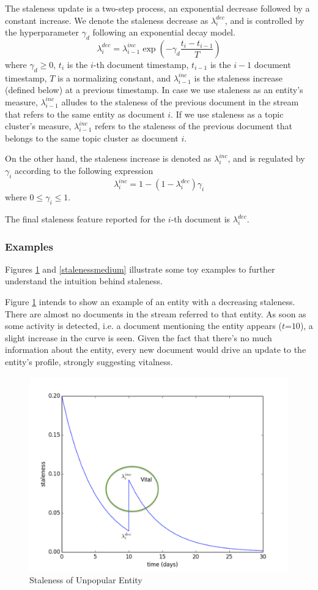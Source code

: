 \documentclass{article}
\begin{document}
The staleness update is a two-step process, an exponential decrease followed by a constant increase.
We denote the staleness decrease as $\lambda^{dec}_i$, and is controlled by the hyperparameter $\gamma_d$ following an exponential decay model.
\begin{equation}
\label{decrease}
\lambda^{dec}_i = \lambda^{inc}_{{i-1}} \exp{(-\gamma_d \frac{t_i-t_{i-1}}{T})}
\end{equation}
where $\gamma_d \geq 0$, $t_i$ is the $i$-th document timestamp, $t_{i-1}$ is the $i-1$ document timestamp, $T$ is a normalizing constant, and $\lambda^{inc}_{i-1}$ is the staleness increase (defined below) at a previous timestamp.
In case we use staleness as an entity's measure, $\lambda^{inc}_{i-1}$ alludes to the staleness of the previous document in the stream that refers to the same entity as document $i$.
If we use staleness as a topic cluster's measure, $\lambda^{inc}_{i-1}$ refers to the staleness of the previous document that belongs to the same topic cluster as document $i$.

On the other hand, the staleness increase is denoted as $\lambda^{inc}_i$, and is regulated by $\gamma_i$ according to the following expression
\begin{equation}
\lambda^{inc}_i = 1 - (1 - \lambda^{dec}_i) \gamma_i
\end{equation}
where $0 \leq \gamma_i \leq 1$.

The final staleness feature reported for the $i$-th document is $\lambda^{dec}_i$.

\subsubsection{Examples}

Figures \ref{stalenesslow} and \ref{stalenessmedium} illustrate some toy examples to further understand the intuition behind staleness.

Figure \ref{stalenesslow} intends to show an example of an entity with a decreasing staleness. There are almost no documents in the stream referred to that entity. As soon as some activity is detected, i.e. a document mentioning the entity appears ($t\mathord{=}10$), a slight increase in the curve is seen. Given the fact that there's no much information about the entity, every new document would drive an update to the entity's profile, strongly suggesting vitalness.

\begin{figure}[h!]
\centering
\includegraphics[width=.5\textwidth]{staleness1.pdf}
\caption{Staleness of Unpopular Entity}
\label{stalenesslow}
\end{figure}
\end{document}
